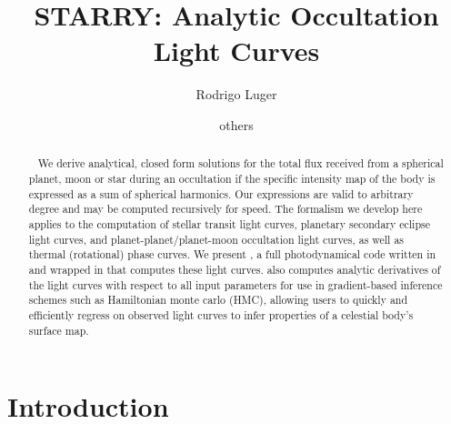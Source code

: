 \documentclass[modern]{aastex61}
\begin{document}

\setlength{\abovedisplayskip}{1.5em}
\setlength{\belowdisplayskip}{1.5em}

\title{%
    \textbf{STARRY}: Analytic Occultation Light Curves
}

\author[0000-0002-0296-3826]{Rodrigo Luger}
\author{others}


\begin{abstract}
    We derive analytical, closed form solutions for the total flux
    received from a spherical planet, moon or star during an occultation
    if the specific intensity map of the body is expressed as a
    sum of spherical harmonics. Our expressions are valid to arbitrary degree
    and may be computed recursively for speed. The formalism we develop
    here applies to the computation of stellar transit light curves,
    planetary secondary eclipse light curves, and planet-planet/planet-moon
    occultation light curves, as well as thermal (rotational) phase curves.
    We present \starry, a full photodynamical code written in \cpp
    and wrapped in \Python that computes these light curves. \starry also
    computes analytic derivatives of the light curves with respect to all input
    parameters for use in gradient-based inference schemes such as
    Hamiltonian monte carlo (HMC), allowing users to quickly and efficiently
    regress on observed light curves to infer properties of a celestial body's
    surface map.
\end{abstract}

%


%
\section{Introduction}
\label{sec:intro}

\end{document}
